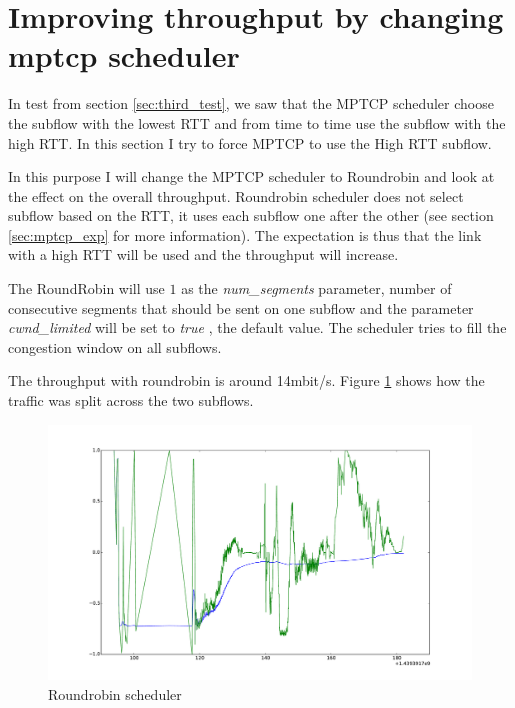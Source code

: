 \newpage

\section{Improving throughput by changing mptcp scheduler} \label{sec:improving_throughput_scheduler}


In test from section \ref{sec:third_test}, we saw that the MPTCP scheduler choose the subflow with the lowest RTT and from time to time use the subflow with the high RTT.
In this section I try to force MPTCP to use the High RTT subflow.

In this purpose I will change the MPTCP scheduler to Roundrobin and look at the effect on the overall throughput.
Roundrobin scheduler does not select subflow based on the RTT, it uses each subflow one after the other
(see section \ref{sec:mptcp_exp} for more information). The expectation is thus that the link with a high RTT will be used and the throughput will increase.

The RoundRobin will use $1$ as the \textit{num\_segments} parameter, number of consecutive segments that should be sent on one subflow and the parameter \textit{cwnd\_limited} will be set to \textit{true}
, the default value. The scheduler tries to fill the congestion window on all subflows.

The throughput with roundrobin is around 14mbit/s. Figure \ref{roundrobin} shows how the traffic was split across the two subflows. 

\begin{figure}[h!]
  \centering
  \includegraphics[width=1\textwidth]{../results/roundrobin.pdf}
  \caption{Roundrobin scheduler}
  \label{roundrobin}
\end{figure}
